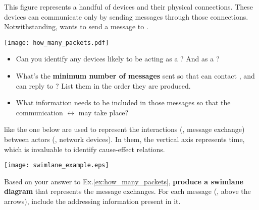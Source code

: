 \begin{exercise}
This figure represents a handful of devices and their physical connections.
These devices can communicate only by sending messages through 
those connections. Notwithstanding,  wants to send a message to .\\
% 
\begin{center}
\texttt{[image: how\_many\_packets.pdf]}\\
\end{center}
% 
\begin{itemize}
 \item Can you identify any devices likely to be acting as a ? And as a ?
 \item What's the \textbf{minimum number of messages} sent so that  can contact ,
 and  can reply to ? List them in the order they are produced.
 \item What information needs to be included in those messages so that the communication 
  $\leftrightarrow$  may take place?
\end{itemize}
\label{ex:how_many_packets}
\end{exercise}
% 

 like the one below are used to represent the interactions
(\eg, message exchange) between actors (\eg, network devices). In them, the vertical axis represents 
time, which is invaluable to identify cause-effect relations.
\begin{center}
\texttt{[image: swimlane\_example.eps]}
\end{center}

\begin{exercise}
Based on your answer to Ex.\ref{ex:how_many_packets}, \textbf{produce a swimlane diagram}
that represents the message exchanges. For each message (\eg, above the arrows), 
include the addressing information present in it.
\end{exercise}

